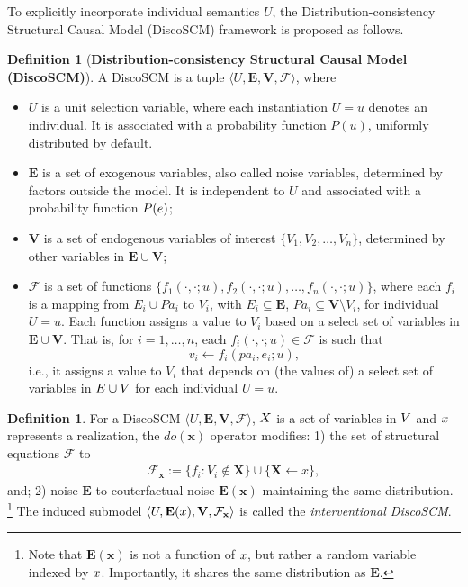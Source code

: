\documentclass[letterpaper]{article} %
\theoremstyle{definition}
\newtheorem{definition}[theorem]{Definition}
\theoremstyle{remark}
\begin{document}
To explicitly incorporate individual semantics $U$, the Distribution-consistency Structural Causal Model (DiscoSCM) framework is proposed as follows.
\begin{definition}[\textbf{Distribution-consistency Structural Causal Model (DiscoSCM)}]
    \label{def:discoscm}
    A DiscoSCM is a tuple $\langle  U, \mathbf{E}, \mathbf{V}, \mathcal{F}\rangle$, where
    \begin{itemize}
        \item $U$ is a unit selection variable, where each instantiation $U=u$ denotes an individual. It is associated with a probability function $P(u)$, uniformly distributed by default.
        \item $\mathbf{E}$ is a set of exogenous variables, also called noise variables, determined by factors outside the model. It is independent to $U$ and associated with a probability function $P(\*e)$;
        \item $\mathbf{V}$ is a set of endogenous variables of interest $\{V_1, V_2, \ldots, V_n\}$, determined by other variables in $\mathbf{E} \cup \mathbf{V}$;
        \item $\mathcal{F}$ is a set of functions $\{f_1(\cdot, \cdot; u), f_2(\cdot, \cdot; u), \ldots, f_n(\cdot, \cdot; u)\}$, where each $f_i$ is a mapping from $E_{i} \cup Pa_{i}$ to $V_{i}$, with $E_{i} \subseteq \mathbf{E}$, $Pa_{i} \subseteq \mathbf{V} \setminus V_{i}$, for individual $U=u$. Each function assigns a value to $V_i$ based on a select set of variables in $\mathbf{E} \cup \mathbf{V}$. That is, for $i=1,\ldots,n$, each $f_i(\cdot, \cdot; u) \in \mathcal{F}$ is such that 
        $$v_i \leftarrow f_{i}(pa_{i}, e_i; u),$$ 
        i.e., it assigns a value to $V_i$ that depends on (the values of) a select set of variables in $\*E \cup \*V$ for each individual $U=u$. 
    \end{itemize}
\end{definition}
\begin{definition}
    For a DiscoSCM $\langle  U, \mathbf{E}, \mathbf{V}, \mathcal{F}\rangle$, $\*X$ is a set of variables in $\*V$ and $\*x$ represents a realization, the $do(\mathbf{x})$ operator modifies: 1) the set of structural equations $\mathcal{F}$ to 
        \begin{align*}
            \mathcal{F}_{\mathbf{x}} := \{f_i : V_i \notin \mathbf{X}\} \cup \{\mathbf{X} \leftarrow x\},
        \end{align*}
        and; 2) noise $\mathbf{E}$ to couterfactual noise $\mathbf{E}(\mathbf{x})$ maintaining the same distribution. \footnote{Note that $\mathbf{E}(\mathbf{x})$ is not a function of $\*x$, but rather a random variable indexed by $\*x$. Importantly, it shares the same distribution as $\mathbf{E}$.} The induced submodel $\langle U, \mathbf{E}(\*x), \mathbf{V}, \mathcal{F}_{\mathbf{x}}\rangle$ is called the \textit{interventional DiscoSCM}.
\end{definition}
\end{document}
